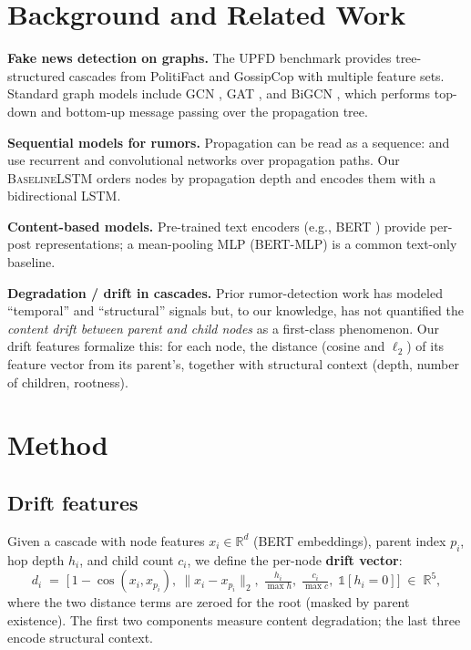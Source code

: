 \documentclass[10pt,twocolumn]{article}
\begin{document}
\section{Background and Related Work}
\label{sec:related}

\textbf{Fake news detection on graphs.} The UPFD benchmark \cite{dou2021upfd}
provides tree-structured cascades from PolitiFact and GossipCop with multiple
feature sets. Standard graph models include GCN \cite{kipf2017gcn}, GAT
\cite{velickovic2018gat}, and BiGCN \cite{bian2020bigcn}, which performs
top-down and bottom-up message passing over the propagation tree.

\textbf{Sequential models for rumors.} Propagation can be read as a sequence:
\citet{ma2016recurrent} and \citet{liu2018early} use recurrent and convolutional
networks over propagation paths. Our \textsc{BaselineLSTM} orders nodes by
propagation depth and encodes them with a bidirectional LSTM.

\textbf{Content-based models.} Pre-trained text encoders (e.g., BERT
\cite{devlin2019bert}) provide per-post representations; a mean-pooling MLP
(\textsc{BERT-MLP}) is a common text-only baseline.

\textbf{Degradation / drift in cascades.} Prior rumor-detection work has modeled
``temporal'' and ``structural'' signals but, to our knowledge, has not
quantified the \emph{content drift between parent and child nodes} as a
first-class phenomenon. Our drift features formalize this: for each node, the
distance (cosine and $\ell_2$) of its feature vector from its parent's, together
with structural context (depth, number of children, rootness).

\section{Method}
\label{sec:method}

\subsection{Drift features}
\label{sec:drift}

Given a cascade with node features $x_i \in \mathbb{R}^d$ (BERT embeddings),
parent index $p_i$, hop depth $h_i$, and child count $c_i$, we define the
per-node \textbf{drift vector}:
\begin{equation}
d_i \;=\; \Big[\, 1-\cos(x_i, x_{p_i}),\ \lVert x_i - x_{p_i}\rVert_2,\;
\tfrac{h_i}{\max h},\; \tfrac{c_i}{\max c},\; \mathbb{1}[h_i = 0] \Big]
\;\in\; \mathbb{R}^5 ,
\label{eq:drift}
\end{equation}
where the two distance terms are zeroed for the root (masked by parent
existence). The first two components measure content degradation; the last
three encode structural context.
\end{document}
